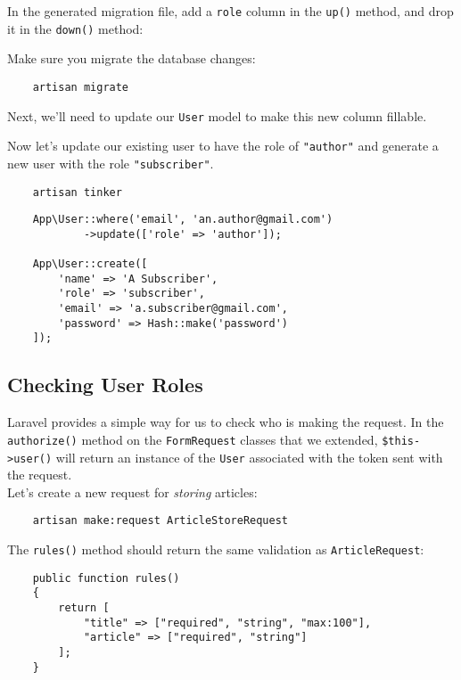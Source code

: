 In the generated migration file, add a \texttt{role} column in the \texttt{up()} method, and drop it in the \texttt{down()} method:


Make sure you migrate the database changes:

\begin{verbatim}
    artisan migrate
\end{verbatim}

Next, we'll need to update our \texttt{User} model to make this new column fillable.


Now let's update our existing user to have the role of \texttt{"author"} and generate a new user with the role \texttt{"subscriber"}.

\begin{verbatim}
    artisan tinker
\end{verbatim}

\begin{verbatim}
    App\User::where('email', 'an.author@gmail.com')
            ->update(['role' => 'author']);

    App\User::create([
        'name' => 'A Subscriber',
        'role' => 'subscriber',
        'email' => 'a.subscriber@gmail.com',
        'password' => Hash::make('password')
    ]);
\end{verbatim}


\subsection{Checking User Roles}

Laravel provides a simple way for us to check who is making the request. In the \texttt{authorize()} method on the \texttt{FormRequest} classes that we extended, \texttt{\$this->user()} will return an instance of the \texttt{User} associated with the token sent with the request.
\\

Let's create a new request for \textit{storing} articles:

\begin{verbatim}
    artisan make:request ArticleStoreRequest
\end{verbatim}

The \texttt{rules()} method should return the same validation as \texttt{ArticleRequest}:

\begin{verbatim}
    public function rules()
    {
        return [
            "title" => ["required", "string", "max:100"],
            "article" => ["required", "string"]
        ];
    }
\end{verbatim}

